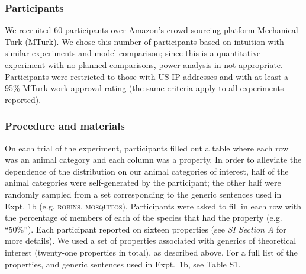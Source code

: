 \documentclass[12pt,letterpaper]{article}
\begin{document}
\subsubsection*{Participants}
We recruited 60 participants over Amazon's crowd-sourcing platform Mechanical Turk (MTurk).  
We chose this number of participants based on intuition with similar experiments and model comparison; 
since this is a quantitative experiment with no planned comparisons, power analysis in not appropriate.
Participants were restricted to those with US IP addresses and with at least a 95\% MTurk work approval rating (the same criteria apply to all experiments reported). 

\subsubsection*{Procedure and materials}
On each trial of the experiment, participants filled out a table where each row was an animal category and each column was a property. 
In order to alleviate the dependence of the distribution on our animal categories of interest, half of the animal categories were self-generated by the participant; the other half were randomly sampled from a set corresponding to the generic sentences used in Expt. 1b (e.g. \textsc{robins, mosquitos}).
Participants were asked to fill in each row with the percentage of members of each of the species that had the property (e.g. ``50\%'').
Each participant reported on sixteen properties (see {\it SI Section A} for more details).
We used a set of properties associated with generics of theoretical interest (twenty-one properties in total), as described above.
For a full list of the properties, and generic sentences used in Expt.~1b, see Table S1.
 
\end{document}

